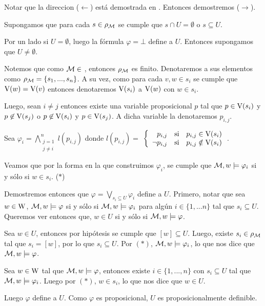 \begin{demostracion}
    Notar que la direccion ($\leftarrow$) está demostrada en . Entonces demostremos ($\rightarrow$).

    Supongamos que para cada $s \in \rho_{\mathcal{M}}$ se cumple que $s \cap U = \emptyset$ o $s \subseteq U$.

    Por un lado si $U = \emptyset$, luego la fórmula $ \varphi = \bot$ define a $U$. Entonces supongamos que $U \neq \emptyset$. 
    
    Notemos que como $\mathcal{M} \in$ \MFD, entonces $\rho_{\mathcal{M}}$ es finito. Denotaremos a sus elementos como $\rho_{\mathcal{M}} = \{s_1,...,s_n\}$. 
    A su vez, como para cada $v,w \in s_i$ se cumple que $\mathrm{V}(w) = \mathrm{V}(v)$ entonces denotaremos $\mathrm{V}(s_i)$ a $\mathrm{V}(w)$ con $w \in s_i$. 
    
    Luego, sean $i \neq j$ entonces existe una variable proposicional $p$ tal que $p \in \mathrm{V}(s_i)$ y $p \not\in \mathrm{V}(s_j)$ o $p \not\in \mathrm{V}(s_i)$ 
    y $p \in \mathrm{V}(s_j)$. A dicha variable la denotaremos $p_{i,j}$.



    Sea $\varphi_i = \bigwedge\limits_{\substack{j = 1 \\ j \neq i}}^{n} l(p_{i,j})$ donde $l(p_{i,j}) = $
    $\left\{ \begin{array}{rcl}
            p_{i,j} & \mbox{si}
            & p_{i,j} \in \mathrm{V}(s_i) \\ \neg p_{i,j} & \mbox{si} & p_{i,j} \notin \mathrm{V}(s_i) \\
            \end{array}\right. 
    $.

    Veamos que por la forma en la que construimos $\varphi_i$, se cumple que $\mathcal{M}, w \models \varphi_i$ si y sólo si $w \in s_i$. ($*$)
    
    Demostremos entonces que $\varphi = \bigvee\limits_{s_i \subseteq U}\varphi_i$ define a $U$. Primero, notar que sea $w \in \mathrm{W}$, 
    $\mathcal{M}, w \models \varphi$ si y sólo si $\mathcal{M}, w \models \varphi_i$ para algún $i \in \{1,...n\}$ tal que $s_i \subseteq U$.  
    Queremos ver entonces que, $w \in U$ si y sólo si $\mathcal{M}, w \models \varphi$. 

    Sea $w \in U$, entonces por hipótesis se cumple que $[w] \subseteq U$. Luego, existe $s_i \in \rho_{\mathcal{M}}$ tal que 
    $s_i = [w]$, por lo que $s_i \subseteq U$. Por $(*)$, $\mathcal{M}, w \models \varphi_i$, lo que nos dice que $\mathcal{M}, w \models \varphi$.

    Sea $w \in \mathrm{W}$ tal que $\mathcal{M}, w \models \varphi$, entonces existe $i \in \{1,...,n\}$ con $s_i \subseteq U$ tal que $\mathcal{M}, w \models \varphi_i$. 
    Luego por $(*)$, $w \in s_i$, lo que nos dice que $w \in U$.

    Luego $\varphi$ define a $U$. Como $\varphi$ es proposicional, $U$ es proposicionalmente definible.
\end{demostracion}

